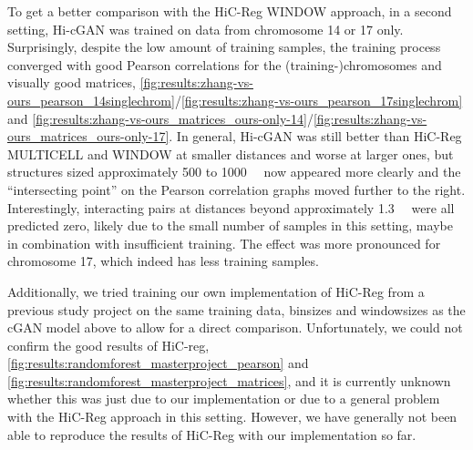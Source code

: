 To get a better comparison with the HiC-Reg WINDOW approach, in a second setting, Hi-cGAN was trained on data from chromosome 14 or 17 only.
Surprisingly, despite the low amount of training samples, the training process converged with good Pearson correlations for the (training\mbox{-})chromosomes and 
visually good matrices, \cref{fig:results:zhang-vs-ours_pearson_14singlechrom}/\ref{fig:results:zhang-vs-ours_pearson_17singlechrom} 
and \ref{fig:results:zhang-vs-ours_matrices_ours-only-14}/\ref{fig:results:zhang-vs-ours_matrices_ours-only-17}.
In general, Hi-cGAN was still better than HiC-Reg MULTICELL and WINDOW at smaller distances and worse at larger ones, 
but structures sized approximately 500 to \SI{1000}{\kilo\bp} now appeared more clearly and the ``intersecting point'' on the Pearson correlation graphs 
moved further to the right.
Interestingly, interacting pairs at distances beyond approximately \SI{1.3}{\kilo\bp} were all predicted zero, likely due to the small number of samples in this setting,
maybe in combination with insufficient training. 
The effect was more pronounced for chromosome 17, which indeed has less training samples.

Additionally, we tried training our own implementation of HiC-Reg from a previous study project \cite{Krauth2020} on the same training data, binsizes and windowsizes as the cGAN model above
to allow for a direct comparison. 
Unfortunately, we could not confirm the good results of HiC-reg, \cref{fig:results:randomforest_masterproject_pearson} and \ref{fig:results:randomforest_masterproject_matrices}, 
and it is currently unknown whether this was just due to our implementation or due to a general problem with the HiC-Reg approach in this setting.
However, we have generally not been able to reproduce the results of HiC-Reg with our implementation so far.

